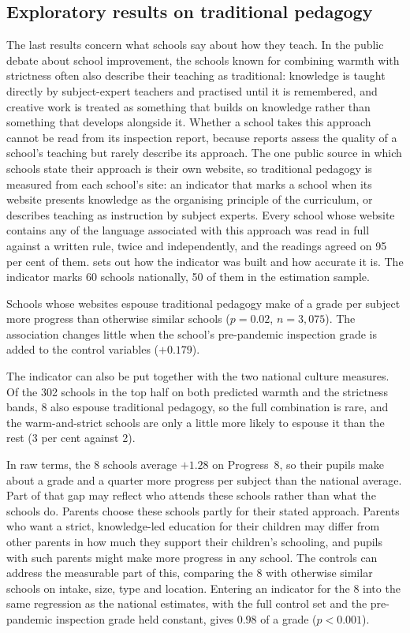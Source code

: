 \subsection{Exploratory results on traditional pedagogy}

The last results concern what schools say about how they teach. In the public debate about school improvement, the schools known for combining warmth with strictness often also describe their teaching as traditional: knowledge is taught directly by subject-expert teachers and practised until it is remembered, and creative work is treated as something that builds on knowledge rather than something that develops alongside it. Whether a school takes this approach cannot be read from its inspection report, because reports assess the quality of a school's teaching but rarely describe its approach. The one public source in which schools state their approach is their own website, so traditional pedagogy is measured from each school's site: an indicator that marks a school when its website presents knowledge as the organising principle of the curriculum, or describes teaching as instruction by subject experts. Every school whose website contains any of the language associated with this approach was read in full against a written rule, twice and independently, and the readings agreed on 95 per cent of them.  sets out how the indicator was built and how accurate it is. The indicator marks 60 schools nationally, 50 of them in the estimation sample.

Schools whose websites espouse traditional pedagogy make \IdPed{} of a grade per subject more progress than otherwise similar schools ($p = 0.02$, $n = 3{,}075$). The association changes little when the school's pre-pandemic inspection grade is added to the control variables ($+0.179$).

The indicator can also be put together with the two national culture measures. Of the 302 schools in the top half on both predicted warmth and the strictness bands, 8 also espouse traditional pedagogy, so the full combination is rare, and the warm-and-strict schools are only a little more likely to espouse it than the rest (3 per cent against 2).

In raw terms, the 8 schools average $+1.28$ on Progress~8, so their pupils make about a grade and a quarter more progress per subject than the national average. Part of that gap may reflect who attends these schools rather than what the schools do. Parents choose these schools partly for their stated approach. Parents who want a strict, knowledge-led education for their children may differ from other parents in how much they support their children's schooling, and pupils with such parents might make more progress in any school. The controls can address the measurable part of this, comparing the 8 with otherwise similar schools on intake, size, type and location. Entering an indicator for the 8 into the same regression as the national estimates, with the full control set and the pre-pandemic inspection grade held constant, gives $0.98$ of a grade ($p < 0.001$).

